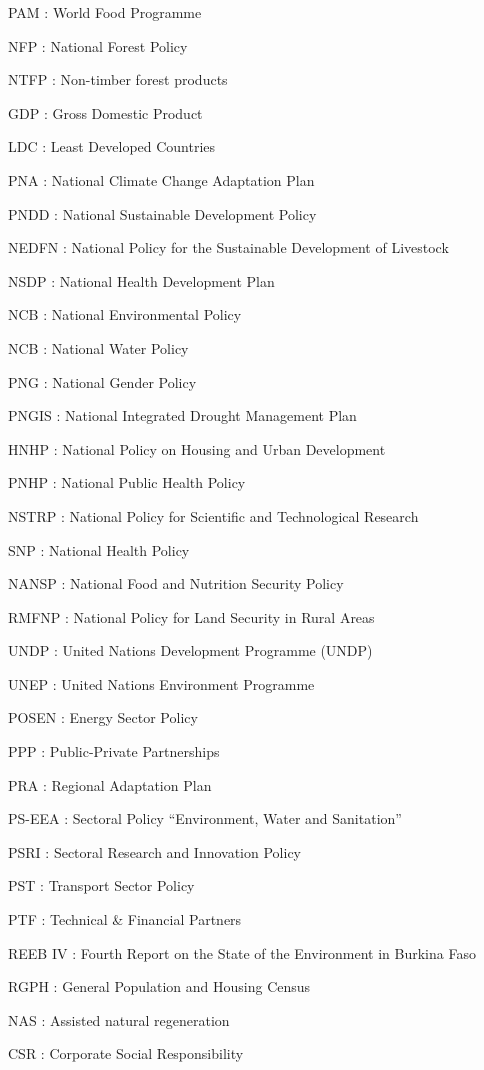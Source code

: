 \documentclass[
]{book}
\begin{document}
PAM : World Food Programme

NFP : National Forest Policy

NTFP : Non-timber forest products

GDP : Gross Domestic Product

LDC : Least Developed Countries

PNA : National Climate Change Adaptation Plan

PNDD : National Sustainable Development Policy

NEDFN : National Policy for the Sustainable Development of Livestock

NSDP : National Health Development Plan

NCB : National Environmental Policy

NCB : National Water Policy

PNG : National Gender Policy

PNGIS : National Integrated Drought Management Plan

HNHP : National Policy on Housing and Urban Development

PNHP : National Public Health Policy

NSTRP : National Policy for Scientific and Technological Research

SNP : National Health Policy

NANSP : National Food and Nutrition Security Policy

RMFNP : National Policy for Land Security in Rural Areas

UNDP : United Nations Development Programme (UNDP)

UNEP : United Nations Environment Programme

POSEN : Energy Sector Policy

PPP : Public-Private Partnerships

PRA : Regional Adaptation Plan

PS-EEA : Sectoral Policy ``Environment, Water and Sanitation''

PSRI : Sectoral Research and Innovation Policy

PST : Transport Sector Policy

PTF : Technical \& Financial Partners

REEB IV : Fourth Report on the State of the Environment in Burkina Faso

RGPH : General Population and Housing Census

NAS : Assisted natural regeneration

CSR : Corporate Social Responsibility
\end{document}
